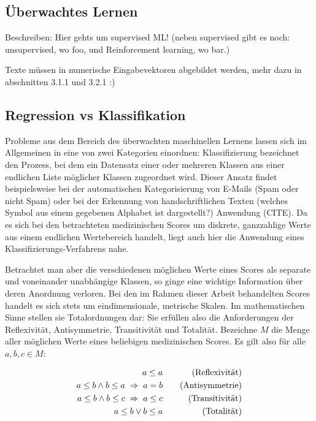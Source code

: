 \subsection{Überwachtes Lernen}\label{section:supervised_learning}
Beschreiben: Hier gehts um supervised ML! (neben supervised gibt es noch: unsupervised, wo foo, und Reinforcement learning, wo bar.)

Texte müssen in numerische Eingabevektoren abgebildet werden, mehr dazu in abschnitten 3.1.1 und 3.2.1 :)

\subsection{Regression vs Klassifikation}\label{section:regrvsclf}
Probleme aus dem Bereich des überwachten maschinellen Lernens lassen sich im Allgemeinen in eine von zwei Kategorien einordnen:
Klassifizierung bezeichnet den Prozess, bei dem ein Datensatz einer oder mehreren Klassen aus einer endlichen Liste möglicher Klassen zugeordnet wird. Dieser Ansatz findet beispielsweise bei der automatischen Kategorisierung von E-Mails (Spam oder nicht Spam) oder bei der Erkennung von handschriftlichen Texten (welches Symbol aus einem gegebenen Alphabet ist dargestellt?) Anwendung (CITE). 
Da es sich bei den betrachteten medizinischen Scores um diskrete, ganzzahlige Werte aus einem endlichen Wertebereich handelt, liegt auch hier die Anwendung eines Klassifizierungs-Verfahrens nahe.

Betrachtet man aber die verschiedenen möglichen Werte eines Scores als separate und voneinander unabhängige Klassen, so ginge eine wichtige Information über deren Anordnung verloren. Bei den im Rahmen dieser Arbeit behandelten Scores handelt es sich stets um eindimensionale, metrische Skalen. Im mathematischen Sinne stellen sie Totalordnungen dar: Sie erfüllen also die Anforderungen der Reflexivität, Antisymmetrie, Transitivität und Totalität. Bezeichne $M$ die Menge aller möglichen Werte eines beliebigen medizinischen Scores. Es gilt also für alle $a,b,c \in M$:

\begin{equation*}
    \centering
    \begin{aligned}[c]
        a \leq a\\
        a \leq b \land b \leq a \; \Rightarrow \; a=b\\
        a \leq b \land b \leq c \; \Rightarrow \; a \leq c\\
        a \leq b \lor b \leq a
    \end{aligned}
    \qquad
    \begin{aligned}[c]
        \text{(Reflexivität)}\\
        \text{(Antisymmetrie)}\\
        \text{(Transitivität)}\\
        \text{(Totalität)}
    \end{aligned}
\end{equation*}

